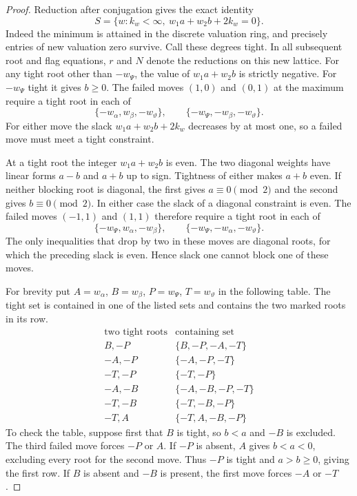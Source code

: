 \begin{proof}
Reduction after conjugation gives the exact identity
\[
 S=\{w:k_w<\infty,\ w_1a+w_2b+2k_w=0\}.
\]
Indeed the minimum is attained in the discrete valuation ring,
and precisely entries of new valuation zero survive. Call these
degrees tight. In all subsequent root and flag equations, \(r\)
and \(N\) denote the reductions on this new lattice. For any tight root other
than \(-w_\Psi\), the value of \(w_1a+w_2b\)
is strictly negative. For \(-w_\Psi\) tight it gives
\(b\ge0\). The failed moves \((1,0)\) and \((0,1)\)
at the maximum require a tight root in each of
\[
 \{-w_\alpha,w_\beta,-w_\vartheta\},\qquad
 \{-w_\Psi,-w_\beta,-w_\vartheta\}.
\]
For either move the slack \(w_1a+w_2b+2k_w\) decreases
by at most one, so a failed move must meet a tight constraint.

At a tight root the integer \(w_1a+w_2b\) is even. The two
diagonal weights have linear forms \(a-b\) and \(a+b\)
up to sign. Tightness of either makes \(a+b\) even.
If neither blocking root is diagonal, the first gives
\(a\equiv0\pmod2\) and the second gives \(b\equiv0\pmod2\).
In either case the slack of a diagonal constraint is even. The failed moves \((-1,1)\) and \((1,1)\)
therefore require a tight root in each of
\[
 \{-w_\Psi,w_\alpha,-w_\beta\},\qquad
 \{-w_\Psi,-w_\alpha,-w_\vartheta\}.
\]
The only inequalities that drop by two in these moves
are diagonal roots, for which the preceding slack is
even. Hence slack one cannot block one of these moves.

For brevity put \(A=w_\alpha\), \(B=w_\beta\),
\(P=w_\Psi\), \(T=w_\vartheta\) in the following
table. The tight set is contained in one of the
listed sets and contains the two marked roots in its
row.
\[
\begin{array}{c|l}
\text{two tight roots}&\text{containing set}\\ \hline
B,-P & \{B,-P,-A,-T\}\\
-A,-P & \{-A,-P,-T\}\\
-T,-P & \{-T,-P\}\\
-A,-B & \{-A,-B,-P,-T\}\\
-T,-B & \{-T,-B,-P\}\\
-T,A & \{-T,A,-B,-P\}
\end{array}
\]
To check the table, suppose first that \(B\) is
tight, so \(b<a\) and \(-B\) is excluded.
The third failed move forces \(-P\) or \(A\).
If \(-P\) is absent, \(A\) gives \(b<a<0\), excluding
every root for the second move. Thus \(-P\) is
tight and \(a>b\ge0\), giving the first row.
If \(B\) is absent and \(-B\) is present, the first
move forces \(-A\) or \(-T\).


\end{proof}
